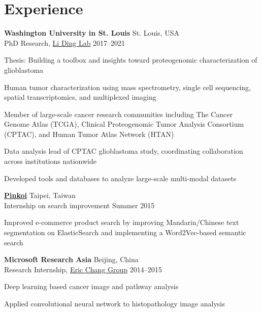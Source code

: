 \section{Experience}

\begin{entrylist}

\item \textbf{Washington University in St. Louis} \hfill St. Louis, USA\\
PhD Research, \href{https://dinglab.wustl.edu/}{Li Ding Lab} \hfill
2017--2021
\begin{detaillist}
    \item Thesis: Building a toolbox and insights toward proteogenomic characterization of glioblastoma
    \item Human tumor characterization using mass spectrometry, single cell sequencing, spatial transcriptomics, and multiplexed imaging
    \item Member of large-scale cancer research communities including The Cancer Genome Atlas (TCGA), Clinical Proteogenomic Tumor Analysis Consortium (CPTAC), and Human Tumor Atlas Network (HTAN)
    \item Data analysis lead of CPTAC glioblastoma study, coordinating collaboration across institutions nationwide
    \item Developed tools and databases to analyze large-scale multi-modal datasets
\end{detaillist}

\item \href{http://pinkoi.com}{\textbf{Pinkoi}} \hfill Taipei, Taiwan\\
Internship on search improvement \hfill
Summer 2015
\begin{detaillist}
    \item Improved e-commerce product search by improving Mandarin/Chinese text segmentation on ElasticSearch and implementing a Word2Vec-based semantic search
\end{detaillist}

\item \textbf{Microsoft Research Asia} \hfill Beijing, China\\
Research Internship, \href{https://www.microsoft.com/en-us/research/people/echang/}{Eric Chang Group} \hfill
2014--2015
\begin{detaillist}
    \item Deep learning based cancer image and pathway analysis
    \item Applied convolutional neural network to histopathology image analysis
\end{detaillist}


\end{entrylist}
